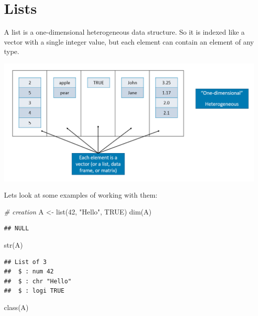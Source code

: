 \documentclass[
]{book}
\newenvironment{Shaded}{\begin{snugshade}}{\end{snugshade}}
\newcommand{\CommentTok}[1]{\textcolor[rgb]{0.56,0.35,0.01}{\textit{#1}}}
\newcommand{\ConstantTok}[1]{\textcolor[rgb]{0.00,0.00,0.00}{#1}}
\newcommand{\DecValTok}[1]{\textcolor[rgb]{0.00,0.00,0.81}{#1}}
\newcommand{\FunctionTok}[1]{\textcolor[rgb]{0.00,0.00,0.00}{#1}}
\newcommand{\NormalTok}[1]{#1}
\newcommand{\OtherTok}[1]{\textcolor[rgb]{0.56,0.35,0.01}{#1}}
\newcommand{\StringTok}[1]{\textcolor[rgb]{0.31,0.60,0.02}{#1}}
\begin{document}
\hypertarget{lists}{%
\section{Lists}\label{lists}}

A list is a one-dimensional heterogeneous data structure. So it is indexed like a vector with a single integer value, but each element can contain an element of any type.

\includegraphics[width=14.5in]{png/List}

Lets look at some examples of working with them:

\begin{Shaded}
\begin{Highlighting}[]
\CommentTok{\# creation}
\NormalTok{A }\OtherTok{\textless{}{-}} \FunctionTok{list}\NormalTok{(}\DecValTok{42}\NormalTok{, }\StringTok{"Hello"}\NormalTok{, }\ConstantTok{TRUE}\NormalTok{)}
\FunctionTok{dim}\NormalTok{(A)}
\end{Highlighting}
\end{Shaded}

\begin{verbatim}
## NULL
\end{verbatim}

\begin{Shaded}
\begin{Highlighting}[]
\FunctionTok{str}\NormalTok{(A)}
\end{Highlighting}
\end{Shaded}

\begin{verbatim}
## List of 3
##  $ : num 42
##  $ : chr "Hello"
##  $ : logi TRUE
\end{verbatim}

\begin{Shaded}
\begin{Highlighting}[]
\FunctionTok{class}\NormalTok{(A)}
\end{Highlighting}
\end{Shaded}
\end{document}
